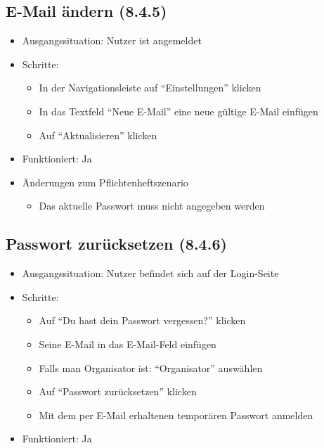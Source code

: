 \documentclass[a4paper]{scrreprt}
\begin{document}
            \subsection{E-Mail ändern (8.4.5)}
            \begin{itemize}
                \item Ausgangssituation: Nutzer ist angemeldet
                \item Schritte:
                    \begin{itemize}
                        \item In der Navigationsleiste auf \enquote{Einstellungen} klicken
                        \item In das Textfeld \enquote{Neue E-Mail} eine neue gültige E-Mail einfügen
                        \item Auf \enquote{Aktualisieren} klicken
                    \end{itemize}
                \item Funktioniert: Ja
                \item Änderungen zum Pflichtenheftszenario
                    \begin{itemize}
                        \item Das aktuelle Passwort muss nicht angegeben werden
                    \end{itemize}
            \end{itemize}

            \subsection{Passwort zurücksetzen (8.4.6)}
            \begin{itemize}
                \item Ausgangssituation: Nutzer befindet sich auf der Login-Seite
                \item Schritte:
                    \begin{itemize}
                        \item Auf \enquote{Du hast dein Passwort vergessen?} klicken
                        \item Seine E-Mail in das E-Mail-Feld einfügen
                        \item Falls man Organisator ist: \enquote{Organisator} auswählen
                        \item Auf \enquote{Passwort zurücksetzen} klicken
                        \item Mit dem per E-Mail erhaltenen temporären Passwort anmelden
                    \end{itemize}
                \item Funktioniert: Ja
            \end{itemize}
\end{document}

